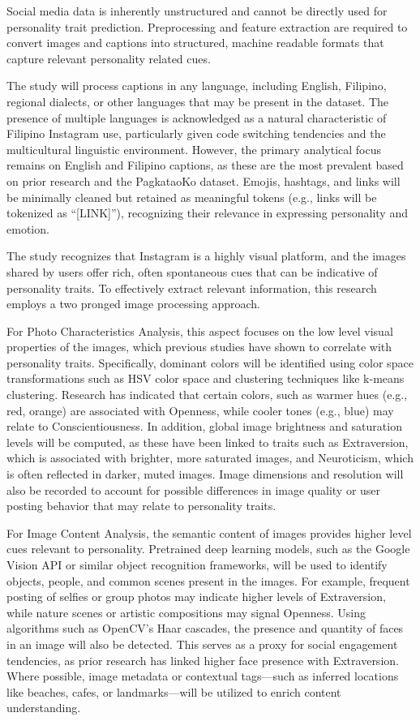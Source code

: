 	Social media data is inherently unstructured and cannot be directly used for personality trait prediction. Preprocessing and feature extraction are required to convert images and captions into structured, machine readable formats that capture relevant personality related cues.
	
	The study will process captions in any language, including English, Filipino, regional dialects, or other languages that may be present in the dataset. The presence of multiple languages is acknowledged as a natural characteristic of Filipino Instagram use, particularly given code switching tendencies and the multicultural linguistic environment. However, the primary analytical focus remains on English and Filipino captions, as these are the most prevalent based on prior research and the PagkataoKo dataset. Emojis, hashtags, and links will be minimally cleaned but retained as meaningful tokens (e.g., links will be tokenized as “[LINK]”), recognizing their relevance in expressing personality and emotion.
	
	The study recognizes that Instagram is a highly visual platform, and the images shared by users offer rich, often spontaneous cues that can be indicative of personality traits. To effectively extract relevant information, this research employs a two pronged image processing approach.
	
	For Photo Characteristics Analysis, this aspect focuses on the low level visual properties of the images, which previous studies have shown to correlate with personality traits. Specifically, dominant colors will be identified using color space transformations such as HSV color space and clustering techniques like k-means clustering. Research has indicated that certain colors, such as warmer hues (e.g., red, orange) are associated with Openness, while cooler tones (e.g., blue) may relate to Conscientiousness. In addition, global image brightness and saturation levels will be computed, as these have been linked to traits such as Extraversion, which is associated with brighter, more saturated images, and Neuroticism, which is often reflected in darker, muted images. Image dimensions and resolution will also be recorded to account for possible differences in image quality or user posting behavior that may relate to personality traits.
	
	For Image Content Analysis, the semantic content of images provides higher level cues relevant to personality. Pretrained deep learning models, such as the Google Vision API or similar object recognition frameworks, will be used to identify objects, people, and common scenes present in the images. For example, frequent posting of selfies or group photos may indicate higher levels of Extraversion, while nature scenes or artistic compositions may signal Openness. Using algorithms such as OpenCV’s Haar cascades, the presence and quantity of faces in an image will also be detected. This serves as a proxy for social engagement tendencies, as prior research has linked higher face presence with Extraversion. Where possible, image metadata or contextual tags—such as inferred locations like beaches, cafes, or landmarks—will be utilized to enrich content understanding.
	
